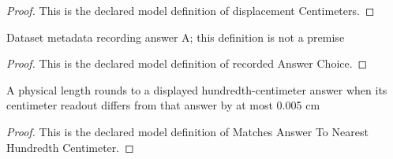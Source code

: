 \begin{proof}
  This is the declared model definition of displacement Centimeters.
\end{proof}
\begin{definition}
  \label{def:physics:phyx-mini-0102:phyxminiproblems-problemphyxmini0102-recordedanswerchoice}
  Dataset metadata recording answer A; this definition is not a premise
\end{definition}
\begin{proof}
  This is the declared model definition of recorded Answer Choice.
\end{proof}
\begin{definition}
  \label{def:physics:phyx-mini-0102:phyxminiproblems-problemphyxmini0102-matchesanswertonearesthundredthcentimeter}
  A physical length rounds to a displayed hundredth-centimeter answer when its centimeter readout differs from that answer by at most 0.005 cm
\end{definition}
\begin{proof}
  This is the declared model definition of Matches Answer To Nearest Hundredth Centimeter.
\end{proof}
